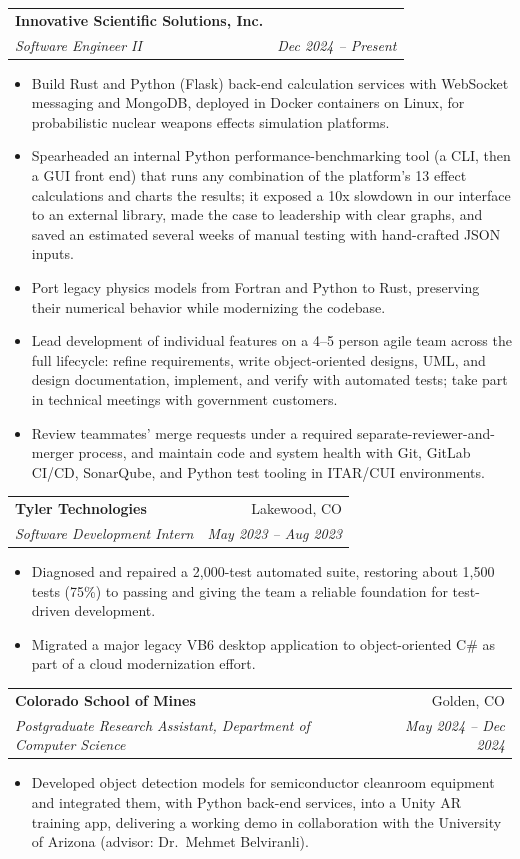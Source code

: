 \documentclass[letterpaper,10pt]{article}
\makeatletter
\newcommand{\entry}[4]{%
  \begin{tabularx}{\linewidth}{@{}X r@{}}
    \textbf{#1} & #2 \\
    \textit{#3} & \textit{\small #4} \\
  \end{tabularx}\vspace{-2pt}%
}
\makeatother
\begin{document}
\entry{Innovative Scientific Solutions, Inc.}{}{Software Engineer II}{Dec 2024 -- Present}
\begin{itemize}
  \item Build Rust and Python (Flask) back-end calculation services with WebSocket messaging and MongoDB, deployed
        in Docker containers on Linux, for probabilistic nuclear weapons effects simulation platforms.
  \item Spearheaded an internal Python performance-benchmarking tool (a CLI, then a GUI front end) that runs any
        combination of the platform's 13 effect calculations and charts the results; it exposed a 10x slowdown in our
        interface to an external library, made the case to leadership with clear graphs, and saved an estimated
        several weeks of manual testing with hand-crafted JSON inputs.
  \item Port legacy physics models from Fortran and Python to Rust, preserving their numerical behavior while
        modernizing the codebase.
  \item Lead development of individual features on a 4--5 person agile team across the full lifecycle: refine
        requirements, write object-oriented designs, UML, and design documentation, implement, and verify with
        automated tests; take part in technical meetings with government customers.
  \item Review teammates' merge requests under a required separate-reviewer-and-merger process, and maintain code
        and system health with Git, GitLab CI/CD, SonarQube, and Python test tooling in ITAR/CUI environments.
\end{itemize}

\entry{Tyler Technologies}{Lakewood, CO}{Software Development Intern}{May 2023 -- Aug 2023}
\begin{itemize}
  \item Diagnosed and repaired a 2,000-test automated suite, restoring about 1,500 tests (75\%) to passing and giving
        the team a reliable foundation for test-driven development.
  \item Migrated a major legacy VB6 desktop application to object-oriented C\# as part of a cloud modernization effort.
\end{itemize}

\entry{Colorado School of Mines}{Golden, CO}{Postgraduate Research Assistant, Department of Computer Science}{May 2024 -- Dec 2024}
\begin{itemize}
  \item Developed object detection models for semiconductor cleanroom equipment and integrated them, with Python
        back-end services, into a Unity AR training app, delivering a working demo in collaboration with the
        University of Arizona (advisor: Dr.\ Mehmet Belviranli).
\end{itemize}
\end{document}
